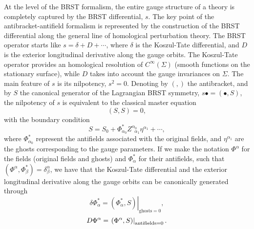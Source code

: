 \documentclass[a4paper,12pt]{article}
\begin{document}
At the level of the BRST formalism, the entire gauge structure of a theory
is completely captured by the BRST differential, $s$. The key point of the
antibracket-antifield formalism is represented by the construction of the
BRST differential along the general line of homological perturbation theory.
The BRST operator starts like $s=\delta +D+\cdots $, where $\delta $ is the
Koszul-Tate differential, and $D$ is the exterior longitudinal derivative
along the gauge orbits. The Koszul-Tate operator provides an homological
resolution of $C^{\infty }\left( \Sigma \right) $ (smooth functions on the
stationary surface), while $D$ takes into account the gauge invariances on $%
\Sigma $. The main feature of $s$ is its nilpotency, $s^{2}=0$. Denoting by $%
\left( ,\right) $ the antibracket, and by $S$ the canonical generator of the
Lagrangian BRST symmetry, $s\bullet =\left( \bullet ,S\right) $, the
nilpotency of $s$ is equivalent to the classical master equation 
\begin{equation}
\left( S,S\right) =0,  \label{sp3.d1}
\end{equation}
with the boundary condition 
\begin{equation}
S=S_{0}+\Phi _{\alpha _{0}}^{*}Z_{\;\;\alpha _{1}}^{\alpha _{0}}\eta
^{\alpha _{1}}+\cdots ,  \label{sp3.d2}
\end{equation}
where $\Phi _{\alpha _{0}}^{*}$ represent the antifields associated with the
original fields, and $\eta ^{\alpha _{1}}$ are the ghosts corresponding to
the gauge parameters. If we make the notation $\Phi ^{\alpha }$ for the
fields (original fields and ghosts) and $\Phi _{\alpha }^{*}$ for their
antifields, such that $\left( \Phi ^{\alpha },\Phi _{\beta }^{*}\right)
=\delta _{\beta }^{\alpha }$, we have that the Koszul-Tate differential and
the exterior longitudinal derivative along the gauge orbits can be
canonically generated through 
\begin{equation}
\delta \Phi _{\alpha }^{*}=\left. \left( \Phi _{\alpha }^{*},S\right)
\right| _{\mathrm{ghosts}=0},  \label{sp3.d3}
\end{equation}
\begin{equation}
D\Phi ^{\alpha }=\left. \left( \Phi ^{\alpha },S\right) \right| _{\mathrm{%
antifields}=0}.  \label{sp3.d4}
\end{equation}
\end{document}
